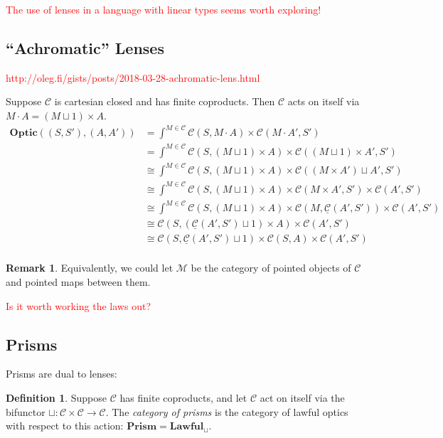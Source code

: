 \documentclass[11pt,a4paper]{article}
\theoremstyle{plain}
\theoremstyle{definition}
\newtheorem{definition}[theorem]{Definition}
\newtheorem{remark}[theorem]{Remark}
\newcommand{\C}{\mathscr{C}}
\newcommand{\homC}{\underline{\C}}
\newcommand{\M}{\mathscr{M}}
\newcommand{\Optic}{\mathbf{Optic}}
\newcommand{\Lawful}{\mathbf{Lawful}}
\newcommand{\Prism}{\mathbf{Prism}}
\newcommand{\todo}[1]{\textcolor{red}{\small #1}}
\begin{document}
\todo{The use of lenses in a language with linear types seems worth exploring!}

\subsection{``Achromatic'' Lenses}
\todo{http://oleg.fi/gists/posts/2018-03-28-achromatic-lens.html}

Suppose $\C$ is cartesian closed and has finite coproducts. Then $\C$ acts on itself via $M \cdot A = (M \sqcup 1) \times A$.
\begin{align*}
  \Optic((S, S'), (A, A'))
  &= \int^{M \in \C} \C(S, M \cdot A) \times \C(M \cdot A', S') \\
  &= \int^{M \in \C} \C(S, (M \sqcup 1) \times A) \times \C((M \sqcup 1) \times A', S') \\
  &\cong \int^{M \in \C} \C(S, (M \sqcup 1) \times A) \times \C((M \times A') \sqcup A', S') \\
  &\cong \int^{M \in \C} \C(S, (M \sqcup 1) \times A) \times \C(M \times A', S') \times \C(A', S') \\
  &\cong \int^{M \in \C} \C(S, (M \sqcup 1) \times A) \times \C(M, \homC(A', S')) \times \C(A', S') \\
  &\cong \C(S, (\homC(A', S') \sqcup 1) \times A) \times \C(A', S') \\
  &\cong \C(S, \homC(A', S') \sqcup 1) \times \C(S, A) \times \C(A', S') \\
\end{align*}

\begin{remark}
  Equivalently, we could let $\M$ be the category of pointed objects of $\C$ and pointed maps between them.
\end{remark}

\todo{Is it worth working the laws out?}

\subsection{Prisms}
Prisms are dual to lenses:

\begin{definition}
  Suppose $\C$ has finite coproducts, and let $\C$ act on itself via the bifunctor $\sqcup : \C \times \C \to \C$. The \emph{category of prisms} is the category of lawful optics with respect to this action: $\Prism = \Lawful_\sqcup$.
\end{definition}
\end{document}
